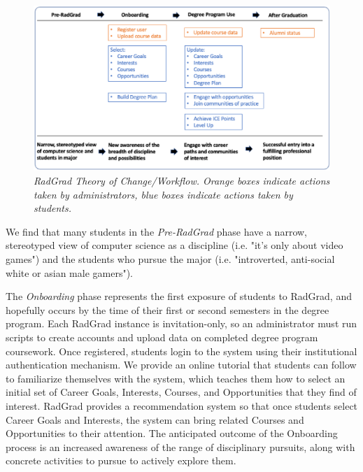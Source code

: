 \documentclass[acmsmall]{acmart}
\begin{document}
\begin{figure}[ht]
\centering
\includegraphics[width=\linewidth]{radgrad-workflow.eps}
\caption{\em RadGrad Theory of Change/Workflow. Orange boxes indicate actions taken by administrators, blue boxes indicate actions taken by students.}
\label{fig:theory-of-change}
\end{figure}

We find that many students in the {\em Pre-RadGrad} phase have a narrow, stereotyped view of computer science as a discipline (i.e. "it's only about video games") and the students who pursue the major (i.e. "introverted, anti-social white or asian male gamers").

The {\em Onboarding} phase represents the first exposure of students to RadGrad, and hopefully occurs by the time of their first or second semesters in the degree program. Each RadGrad instance is invitation-only, so an administrator must run scripts to create accounts and upload data on completed degree program coursework. Once registered, students login to the system using their institutional authentication mechanism. We provide an online tutorial that students can follow to familiarize themselves with the system, which teaches them how to select an initial set of Career Goals, Interests, Courses, and Opportunities that they find of interest. RadGrad provides a recommendation system so that once students select Career Goals and Interests, the system can bring related Courses and Opportunities to their attention.  The anticipated outcome of the Onboarding process is an increased awareness of the range of disciplinary pursuits, along with concrete activities to pursue to actively explore them.
\end{document}
